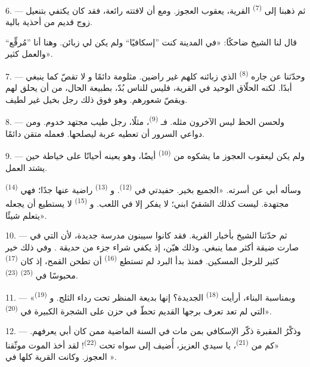 6. --- ثم ذهبنا إلى  \textsuperscript{(7)} القرية، يعقوب العجوز.
ومع أن لافتته  رائعة، فقد كان يكتفي بتنعيل زوج قديم من أحذية
بالية.

قال لنا الشيخ ضاحكًا: «في المدينة كنت ”إسكافيًا“ ولم يكن لي زبائن. وهنا
أنا ”مُرقِّع“ والعمل كثير».

7. --- وحدّثنا عن جاره  \textsuperscript{(8)} الذي زبائنه كلهم
غير راضين.  مثلومة دائمًا و لا تقصّ كما
ينبغي أبدًا. لكنه الحلّاق الوحيد في القرية، فليس للناس بُدّ، بطبيعة
الحال، من أن يحلق لهم ويقصّ شعورهم. وهو فوق ذلك رجل بخيل غير لطيف.

8. --- ولحسن الحظ ليس  الآخرون مثله. فـ \textsuperscript{(9)}، مثلًا، رجل طيب مجتهد خدوم. ومن دواعي السرور أن
تعطيه عربة ليصلحها. فعمله متقن دائمًا.

9. --- ولم يكن ليعقوب العجوز ما يشكوه من  \textsuperscript{(10)}
أيضًا، وهو يعينه أحيانًا على خياطة  حين يشتد العمل.

وسأله أبي عن أسرته. «الجميع بخير. حفيدتي في 
\textsuperscript{(12)}. و \textsuperscript{(13)} راضية عنها جدًا؛ فهي
 \textsuperscript{(14)} مجتهدة. ليست كذلك الشقيّ ابني؛ لا يفكر
إلا في اللعب. و \textsuperscript{(15)} لا يستطيع أن يجعله يتعلم
شيئًا».

\VUsaut{3.0mm}
\VUsaut{3.0mm}

10. --- ثم حدّثنا الشيخ بأخبار القرية. فقد كانوا سيبنون مدرسة جديدة، لأن
التي في  صارت ضيقة أكثر مما ينبغي. وذلك هيّن، إذ يكفي
شراء جزء من حديقة . وفي ذلك خير كثير للرجل المسكين. فمنذ
بدأ البرد لم تستطع   \textsuperscript{(16)} أن
تطحن القمح، إذ كان  \textsuperscript{(17)} محبوسًا في
 \textsuperscript{(25)}  \textsuperscript{(23)}.

11. --- «وبمناسبة البناء، أرأيت  \textsuperscript{(18)} الجديدة؟
إنها بديعة المنظر تحت رداء الثلج. و \textsuperscript{(19)} التي
لم تعد تعرف برجها القديم تحطّ في حزن على الشجرة الكبيرة في
 \textsuperscript{(20)}».

12. --- وذكْرُ المقبرة ذكّر الإسكافي بمن مات في السنة الماضية ممن كان أبي
يعرفهم. «كم من  \textsuperscript{(21)}، يا سيدي العزيز، أُضيف إلى
سواه تحت  \textsuperscript{(22)}! لقد أخذ الموت موثّقنا العجوز.
وكانت القرية كلها في ».


